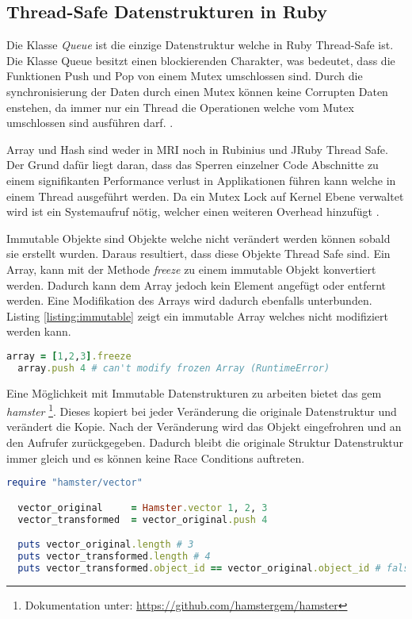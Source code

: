 \subsection{Thread-Safe Datenstrukturen in Ruby}
Die Klasse \emph{Queue} ist die einzige Datenstruktur welche in Ruby Thread-Safe ist. Die Klasse Queue besitzt einen blockierenden Charakter, was bedeutet, dass die Funktionen Push und Pop von einem Mutex umschlossen sind. Durch die synchronisierung der Daten durch einen Mutex können keine Corrupten Daten enstehen, da immer nur ein Thread die Operationen welche vom Mutex umschlossen sind ausführen darf. \cite[p. 110]{Sto2013}. 

Array und Hash sind weder in MRI noch in Rubinius und JRuby Thread Safe. Der Grund dafür liegt daran, dass das Sperren einzelner Code Abschnitte zu einem signifikanten Performance verlust in Applikationen führen kann welche in einem Thread ausgeführt werden. Da ein Mutex Lock auf Kernel Ebene verwaltet wird ist ein Systemaufruf nötig, welcher einen weiteren Overhead hinzufügt \cite[p. 110]{Sto2013}.

Immutable Objekte sind Objekte welche nicht verändert werden können sobald sie erstellt wurden. Daraus resultiert, dass diese Objekte Thread Safe sind. Ein Array, kann mit der Methode \emph{freeze} zu einem immutable Objekt konvertiert werden. Dadurch kann dem Array jedoch kein Element angefügt oder entfernt werden. Eine Modifikation des Arrays wird dadurch ebenfalls unterbunden. Listing \ref{listing:immutable} zeigt ein immutable Array welches nicht modifiziert werden kann. 

\begin{lstlisting}[language=Ruby,label={listing:immutable}]
  array = [1,2,3].freeze
  array.push 4 # can't modify frozen Array (RuntimeError)
\end{lstlisting}

Eine Möglichkeit mit Immutable Datenstrukturen zu arbeiten bietet das gem \emph{hamster} \footnote{Dokumentation unter: \url{https://github.com/hamstergem/hamster}}. Dieses kopiert bei jeder Veränderung die originale Datenstruktur und verändert die Kopie. Nach der Veränderung wird das Objekt eingefrohren und an den Aufrufer zurückgegeben. Dadurch bleibt die originale Struktur Datenstruktur immer gleich und es können keine Race Conditions auftreten. 

\begin{lstlisting}[language=Ruby,label={listing:immuteable hamster}]
  require "hamster/vector"

  vector_original     = Hamster.vector 1, 2, 3
  vector_transformed  = vector_original.push 4

  puts vector_original.length # 3
  puts vector_transformed.length # 4
  puts vector_transformed.object_id == vector_original.object_id # false
\end{lstlisting}

